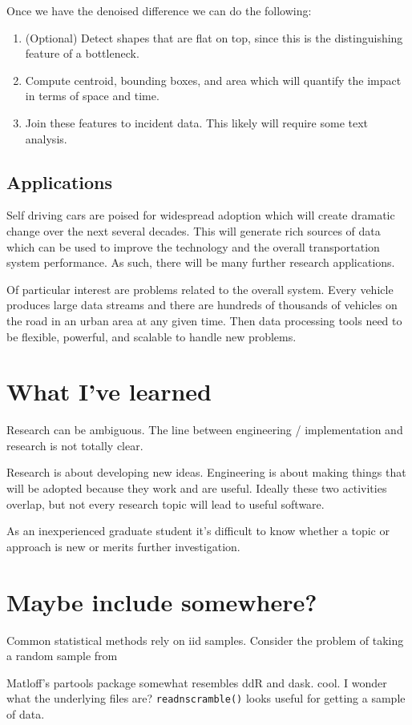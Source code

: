 \documentclass[12pt]{article}
\begin{document}
Once we have the denoised difference we can do the following:
\begin{enumerate}
    \item (Optional) Detect shapes that are flat on top, since this is the
        distinguishing feature of a bottleneck.
    \item Compute centroid, bounding boxes, and area which will quantify the impact
        in terms of space and time.
    \item Join these features to incident data. This likely will require some text
        analysis.
\end{enumerate}


\subsection{Applications}

Self driving cars are poised for widespread adoption which will create
dramatic change over the next several decades. This will generate rich
sources of data which can be used to improve the technology and the overall
transportation system performance.\cite{swan2015connected}
As such, there will be many further research applications.

Of particular interest are problems related to the overall system. Every
vehicle produces large data streams and there are hundreds of
thousands of vehicles on the road in an urban area at any given time.
Then data processing tools need to be flexible, powerful, and scalable to
handle new problems.

\section{What I've learned}

Research can be ambiguous. The line between engineering / implementation
and research is not totally clear.

Research is about developing new ideas. Engineering is about making
things that will be adopted because they work and are useful. Ideally these
two activities overlap, but not every research topic will lead to useful
software.

As an inexperienced graduate student it's difficult to know whether a topic
or approach is new or merits further investigation.


 

\section{Maybe include somewhere?}


Common statistical methods rely on iid samples. Consider the problem of
taking a random sample from

Matloff's partools package \cite{R-partools} somewhat resembles ddR and
dask. cool. I wonder what the underlying files are?
\texttt{readnscramble()} looks useful for getting a sample of data.
\end{document}
